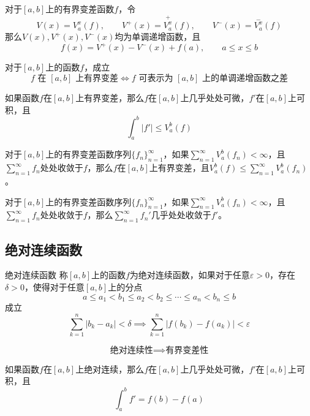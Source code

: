 \documentclass[lang = cn, scheme = chinese, thmcnt = section]{elegantbook}
\newcommand{\dis}{\displaystyle}
\begin{document}
\begin{lemma}
	对于$[a,b]$上的有界变差函数$f$，令%
	$$
	V(x)=V_a^x(f),\qquad 
	V^+(x)=\overset{+}{V_a^x}(f),\qquad 
	V^-(x)=\overset{-}{V_a^x}(f)
	$$
	那么$V(x),V^+(x),V^-(x)$均为单调递增函数，且%
	$$
	f(x)=V^+(x)-V^-(x)+f(a),\qquad a\le x \le b
	$$
\end{lemma}

\begin{theorem}
	对于$[a,b]$上的函数$f$，成立%
	$$
	f\text{ 在 }[a,b]\text{ 上有界变差}
	\iff
	f\text{ 可表示为 }[a,b]\text{ 上的单调递增函数之差}
	$$
\end{theorem}

\begin{theorem}
	如果函数$f$在$[a,b]$上有界变差，那么$f$在$[a,b]$上几乎处处可微，$f'$在$[a,b]$上可积，且
	$$
	\int_{a}^{b}|f'|\le V_a^b(f)
	$$
\end{theorem}

\begin{theorem}
	对于$[a,b]$上的有界变差函数序列$\{ f_n \}_{n=1}^{\infty}$，如果$\dis\sum_{n=1}^{\infty}V_a^b(f_n)<\infty$，且$\dis\sum_{n=1}^{\infty}f_n$处处收敛于$f$，那么$f$在$[a,b]$上有界变差，且$\dis V_a^b(f)\le \sum_{n=1}^{\infty}V_a^b(f_n)$。
\end{theorem}

\begin{theorem}
	对于$[a,b]$上的有界变差函数序列$\{ f_n \}_{n=1}^{\infty}$，如果$\dis\sum_{n=1}^{\infty}V_a^b(f_n)<\infty$，且$\dis\sum_{n=1}^{\infty}f_n$处处收敛于$f$，那么$\dis\sum_{n=1}^{\infty}f_n'$几乎处处收敛于$f'$。
\end{theorem}

\subsection{绝对连续函数}

\begin{definition}{绝对连续函数}
	称$[a,b]$上的函数$f$为绝对连续函数，如果对于任意$\varepsilon>0$，存在$\delta>0$，使得对于任意$[a,b]$上的分点%
	$$
	a\le a_1<b_1\le a_2<b_2\le \cdots \le a_n<b_n\le b
	$$
	成立%
	$$
	\sum_{k=1}^{n}|b_k-a_k|<\delta
	\implies
	\sum_{k=1}^{n}|f(b_k)-f(a_k)|<\varepsilon
	$$
\end{definition}

\begin{theorem}
	$$
	\text{绝对连续性}
	\implies
	\text{有界变差性}
	$$
\end{theorem}

\begin{theorem}
	如果函数$f$在$[a,b]$上绝对连续，那么$f$在$[a,b]$上几乎处处可微，$f'$在$[a,b]$上可积，且
	$$
	\int_{a}^{b}f'=f(b)-f(a)
	$$
\end{theorem}
\end{document}
